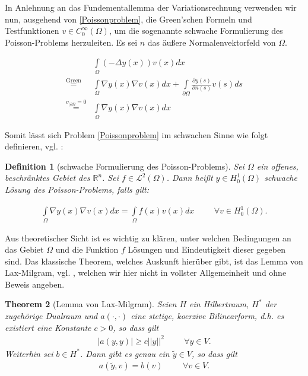 \documentclass[bibliography=totoc,12pt,a4paper]{scrartcl}
\theoremstyle{exampstyle}
\newtheorem{defi}{Definition}%
\newtheorem{theorem}[defi]{Theorem}
\numberwithin{equation}{section}
\begin{document}
In Anlehnung an das Fundementallemma der Variationsrechnung verwenden wir nun, ausgehend von \ref{Poissonproblem}, die Green'schen Formeln und Testfunktionen $v\in C_0^\infty(\Omega)$, um die sogenannte schwache Formulierung des Poisson-Problems herzuleiten. Es sei $n$ das äußere Normalenvektorfeld von $\Omega$.

\begin{align*}
	& \underset{\Omega}{\int}(-\Delta y(x))v(x)dx  \\
	\overset{ \text{Green}}{=} & \underset{\Omega}{\int} \nabla y(x) \nabla v(x)dx 
	+ \underset{\partial\Omega}{\int}\frac{\partial y(s)}{\partial n(s)} v(s)ds \\
	\overset{v_{\vert\partial\Omega}=0}{=}& \underset{\Omega}{\int} \nabla y(x) \nabla v(x)dx 
\end{align*}

Somit lässt sich Problem \ref{Poissonproblem} im schwachen Sinne wie folgt definieren, vgl. \cite{PDE3}:

\begin{defi}[schwache Formulierung des Poisson-Problems]
Sei $\Omega$ ein offenes, beschränktes Gebiet des $\mathbb{R}^n$. Sei $f\in \mathcal{L}^2(\Omega)$. Dann heißt $y\in H_0^1(\Omega)$ \textit{schwache Lösung} des Poisson-Problems, falls gilt:

\begin{align}\label{schw. Poi}
\underset{\Omega}{\int} \nabla y(x) \nabla v(x)dx  = \underset{\Omega}{\int} f(x)v(x)dx \hspace{1cm}\forall v\in H_0^1(\Omega).
\end{align}
\end{defi}

Aus theoretischer Sicht ist es wichtig zu klären, unter welchen Bedingungen an das Gebiet $\Omega$ und die Funktion $f$ Lösungen und Eindeutigkeit dieser gegeben sind. Das klassische Theorem, welches Auskunft hierüber gibt, ist das Lemma von Lax-Milgram, vgl. \cite{PDE3}, welchen wir hier nicht in vollster Allgemeinheit und ohne Beweis angeben.

\begin{theorem}[Lemma von Lax-Milgram]
Seien $H$ ein Hilbertraum, $H^*$ der zugehörige Dualraum und $a(\cdot, \cdot)$ eine stetige, \textit{koerzive} Bilinearform, d.h. es existiert eine Konstante $c > 0$, so dass gilt
\begin{align*}
	\vert a(y,y) \vert \geq c\vert\vert y \vert\vert^2 \hspace{1cm} \forall y \in V.
\end{align*}
Weiterhin sei $b\in H^*$. Dann gibt es genau ein $\tilde{y} \in V$, so dass gilt
\begin{align*}
a(\tilde{y},v) = b(v) \hspace{1cm} \forall v \in V.
\end{align*}
\end{theorem}
\end{document}
